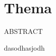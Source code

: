 %
%
%
%
\chapter{Thema\label{chapter:antennen}}
\begin{refsection}

ABSTRACT

dasodhasjodh


%
%
%


\printbibliography[heading=subbibliography]
\end{refsection}
